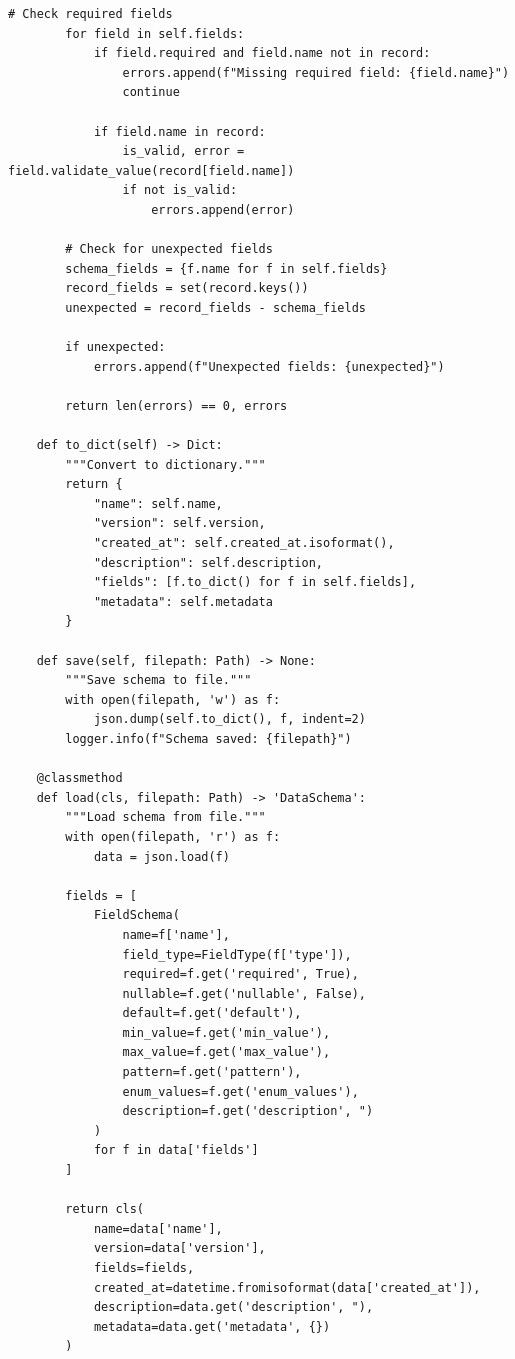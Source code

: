 \begin{lstlisting}[style=python, caption={Schema registry with versioning and compatibility}]
        # Check required fields
        for field in self.fields:
            if field.required and field.name not in record:
                errors.append(f"Missing required field: {field.name}")
                continue

            if field.name in record:
                is_valid, error = field.validate_value(record[field.name])
                if not is_valid:
                    errors.append(error)

        # Check for unexpected fields
        schema_fields = {f.name for f in self.fields}
        record_fields = set(record.keys())
        unexpected = record_fields - schema_fields

        if unexpected:
            errors.append(f"Unexpected fields: {unexpected}")

        return len(errors) == 0, errors

    def to_dict(self) -> Dict:
        """Convert to dictionary."""
        return {
            "name": self.name,
            "version": self.version,
            "created_at": self.created_at.isoformat(),
            "description": self.description,
            "fields": [f.to_dict() for f in self.fields],
            "metadata": self.metadata
        }

    def save(self, filepath: Path) -> None:
        """Save schema to file."""
        with open(filepath, 'w') as f:
            json.dump(self.to_dict(), f, indent=2)
        logger.info(f"Schema saved: {filepath}")

    @classmethod
    def load(cls, filepath: Path) -> 'DataSchema':
        """Load schema from file."""
        with open(filepath, 'r') as f:
            data = json.load(f)

        fields = [
            FieldSchema(
                name=f['name'],
                field_type=FieldType(f['type']),
                required=f.get('required', True),
                nullable=f.get('nullable', False),
                default=f.get('default'),
                min_value=f.get('min_value'),
                max_value=f.get('max_value'),
                pattern=f.get('pattern'),
                enum_values=f.get('enum_values'),
                description=f.get('description', ")
            )
            for f in data['fields']
        ]

        return cls(
            name=data['name'],
            version=data['version'],
            fields=fields,
            created_at=datetime.fromisoformat(data['created_at']),
            description=data.get('description', "),
            metadata=data.get('metadata', {})
        )



\end{lstlisting}
